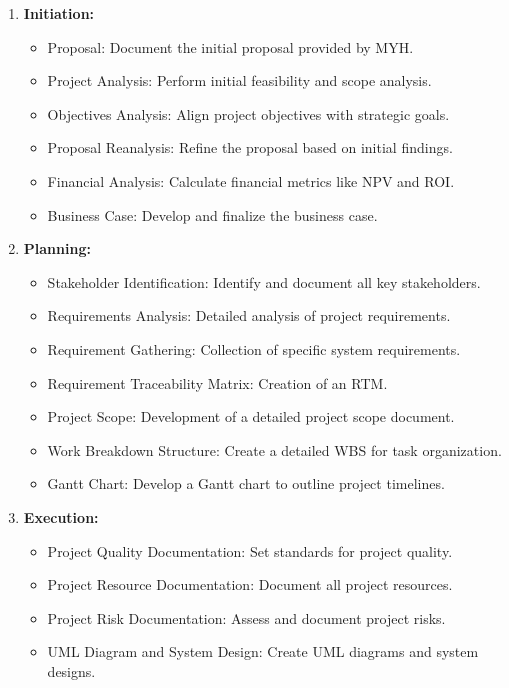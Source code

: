 \begin{enumerate}
    \item \textbf{Initiation:}
        \begin{itemize}
            \item Proposal: Document the initial proposal provided by MYH.
            \item Project Analysis: Perform initial feasibility and scope analysis.
            \item Objectives Analysis: Align project objectives with strategic goals.
            \item Proposal Reanalysis: Refine the proposal based on initial findings.
            \item Financial Analysis: Calculate financial metrics like NPV and ROI.
            \item Business Case: Develop and finalize the business case.
        \end{itemize}

    \item \textbf{Planning:}
        \begin{itemize}
            \item Stakeholder Identification: Identify and document all key stakeholders.
            \item Requirements Analysis: Detailed analysis of project requirements.
            \item Requirement Gathering: Collection of specific system requirements.
            \item Requirement Traceability Matrix: Creation of an RTM.
            \item Project Scope: Development of a detailed project scope document.
            \item Work Breakdown Structure: Create a detailed WBS for task organization.
            \item Gantt Chart: Develop a Gantt chart to outline project timelines.
        \end{itemize}

    \item \textbf{Execution:}
        \begin{itemize}
            \item Project Quality Documentation: Set standards for project quality.
            \item Project Resource Documentation: Document all project resources.
            \item Project Risk Documentation: Assess and document project risks.
            \item UML Diagram and System Design: Create UML diagrams and system designs.
        \end{itemize}


\end{enumerate}
